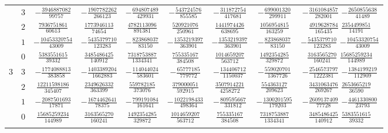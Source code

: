 \begin{table}
\begin{center}
\begin{tabular}{ccccccccc}
           &  $3$  &  $-\frac{ 3946887082}{  99757}$  &  $-\frac{ 1907782262}{  266123}$  &  $-\frac{ 694807489}{  429931}$  &  $-\frac{ 543724576}{  855585}$  &  $-\frac{ 311872754}{  417681}$  &  $-\frac{ 699001320}{  299911} $  &  $-\frac{ 3161084857}{  282001}$  $-\frac{ 2650855638}{  41489}$  \\ \addlinespace
           &  $2$  &  $ \frac{ 7936751861}{  60613}$  &  $ \frac{ 1773946113}{   74654}$  &  $ \frac{4782113096}{  891381}$  &  $ \frac{ 520921076}{  250961}$  &  $ \frac{1441974426}{  638695}$  &  $ \frac{1056954815}{  163259} $  &  $ \frac{ 4919628784}{  165435}$  $ \frac{ 2354499851}{  14191}$  \\ \addlinespace
           &  $1$  &  $-\frac{10453320754}{  43009}$  &  $-\frac{ 5435379710}{  123283}$  &  $-\frac{ 823868037}{   83150}$  &  $-\frac{1353219397}{  363901}$  &  $-\frac{1353219397}{  363901}$  &  $-\frac{ 823868037}{   83150} $  &  $-\frac{ 5435379710}{  123283}$  $-\frac{10453320754}{  43009}$  \\ \addlinespace
           &  $0$  &  $ \frac{ 5383551615}{  39332}$  &  $ \frac{ 3485486425}{  140912}$  &  $ \frac{7318753887}{ 1334341}$  &  $ \frac{ 755335167}{  384508}$  &  $ \frac{1014659207}{  563712}$  &  $ \frac{1492354285}{  329872} $  &  $ \frac{ 3163565270}{  160241}$  $ \frac{15685259234}{ 144989}$  \\ \addlinespace
      $3$  &  $3$  &  $-\frac{ 1774088813}{ 383858}$  &  $-\frac{ 1403389204}{ 1662883}$  &  $-\frac{ 114044024}{  583601}$  &  $-\frac{  65777185}{  779772}$  &  $-\frac{ 134406712}{ 1150037}$  &  $-\frac{ 559020701}{ 1367726} $  &  $-\frac{ 2546573797}{ 1222381}$  $-\frac{ 1384199219}{ 112909}$  \\ \addlinespace
           &  $2$  &  $ \frac{12211598186}{ 345407}$  &  $ \frac{ 2349626332}{  363399}$  &  $ \frac{ 559782185}{  373076}$  &  $ \frac{ 379000051}{  592915}$  &  $ \frac{3507914221}{ 4258272}$  &  $ \frac{ 554363127}{  209623} $  &  $ \frac{ 3431063476}{  269267}$  $ \frac{ 2653665219}{  36590}$  \\ \addlinespace
           &  $1$  &  $-\frac{ 2087501693}{  17871}$  &  $-\frac{ 1674462641}{   78375}$  &  $-\frac{ 799191084}{  161641}$  &  $-\frac{1022198433}{  498364}$  &  $-\frac{ 809595667}{  331812}$  &  $-\frac{1300201595}{  179203} $  &  $-\frac{ 2609137409}{   77728}$  $-\frac{ 4461330800}{  23793}$  \\ \addlinespace
           &  $0$  &  $ \frac{15685259234}{ 144989}$  &  $ \frac{ 3163565270}{  160241}$  &  $ \frac{1492354285}{  329872}$  &  $ \frac{1014659207}{  563712}$  &  $ \frac{ 755335167}{  384508}$  &  $ \frac{7318753887}{ 1334341} $  &  $ \frac{ 3485486425}{  140912}$  $ \frac{ 5383551615}{  39332}$  \\ \addlinespace

\end{tabular}
\end{center}
\end{table}
